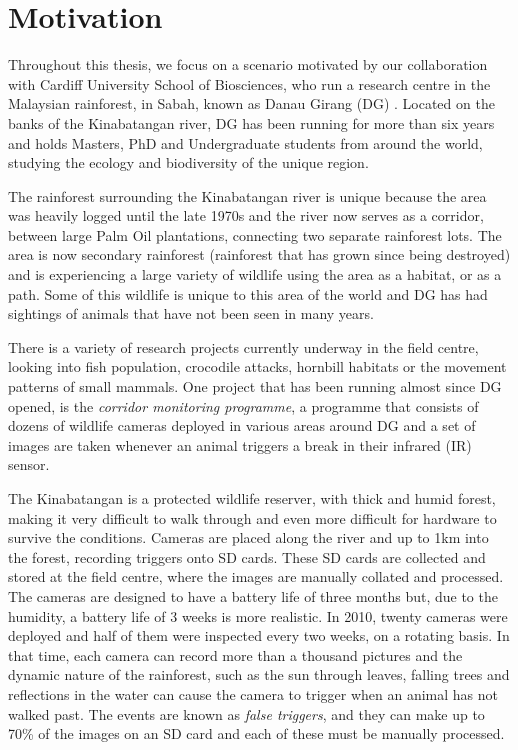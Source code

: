 \section{Motivation}\label{int:mot}
Throughout this thesis, we focus on a scenario motivated by our collaboration with Cardiff University School of Biosciences, who run a research centre in the Malaysian rainforest, in Sabah, known as Danau Girang (DG) . Located on the banks of the Kinabatangan river, DG has been running for more than six years and holds Masters, PhD and Undergraduate students from around the world, studying the ecology and biodiversity of the unique region.

The rainforest surrounding the Kinabatangan river is unique because the area was heavily logged until the late 1970s and the river now serves as a corridor, between large Palm Oil plantations, connecting two separate rainforest lots. The area is now secondary rainforest (rainforest that has grown since being destroyed) and is experiencing a large variety of wildlife using the area as a habitat, or as a path. Some of this wildlife is unique to this area of the world and DG has had sightings of animals that have not been seen in many years.

There is a variety of research projects currently underway in the field centre, looking into fish population, crocodile attacks, hornbill habitats or the movement patterns of small mammals. One project that has been running almost since DG opened, is the \textit{corridor monitoring programme}, a programme that consists of dozens of wildlife cameras deployed in various areas around DG and a set of images are taken whenever an animal triggers a break in their infrared (IR)  sensor.

The Kinabatangan is a protected wildlife reserver, with thick and humid forest, making it very difficult to walk through and even more difficult for hardware to survive the conditions. Cameras are placed along the river and up to 1km into the forest, recording triggers onto SD cards. These SD cards are collected and stored at the field centre, where the images are manually collated and processed. The cameras are designed to have a battery life of three months but, due to the humidity, a battery life of 3 weeks is more realistic. In 2010, twenty cameras were deployed and half of them were inspected every two weeks, on a rotating basis. In that time, each camera can record more than a thousand pictures and the dynamic nature of the rainforest, such as the sun through leaves, falling trees and reflections in the water can cause the camera to trigger when an animal has not walked past. The events are known as \textit{false triggers}, and they can make up to 70\% of the images on an SD card and each of these must be manually processed. 

